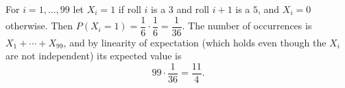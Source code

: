 For $i=1,\dots,99$ let $X_i=1$ if roll $i$ is a $3$ and roll $i+1$ is a $5$, and $X_i=0$ otherwise. Then $P(X_i=1)=\dfrac16\cdot\dfrac16=\dfrac1{36}$. The number of occurrences is $X_1+\cdots+X_{99}$, and by linearity of expectation (which holds even though the $X_i$ are not independent) its expected value is
\[99\cdot\dfrac{1}{36}=\boxed{\dfrac{11}{4}}.\]
